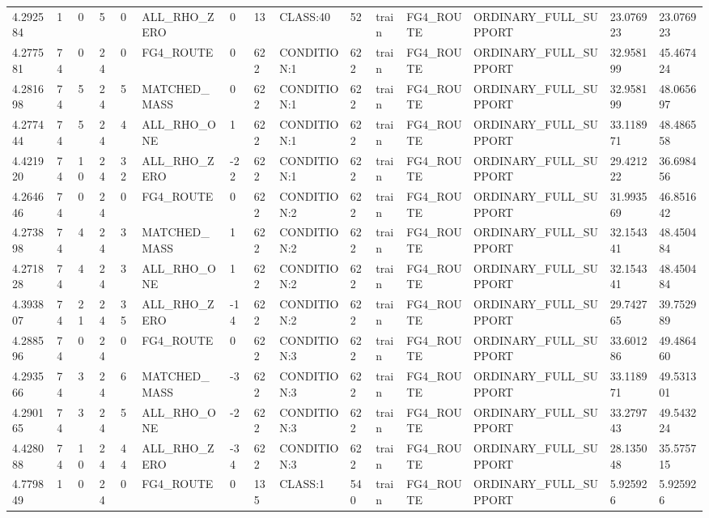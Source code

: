 \begin{tabular}{lllllllllllllll}
4.292584 & 1 & 0 & 5 & 0 & ALL\_RHO\_ZERO & 0 & 13 & CLASS:40 & 52 & train & FG4\_ROUTE & ORDINARY\_FULL\_SUPPORT & 23.076923 & 23.076923 \\
4.277581 & 74 & 0 & 24 & 0 & FG4\_ROUTE & 0 & 622 & CONDITION:1 & 622 & train & FG4\_ROUTE & ORDINARY\_FULL\_SUPPORT & 32.958199 & 45.467424 \\
4.281698 & 74 & 5 & 24 & 5 & MATCHED\_MASS & 0 & 622 & CONDITION:1 & 622 & train & FG4\_ROUTE & ORDINARY\_FULL\_SUPPORT & 32.958199 & 48.065697 \\
4.277444 & 74 & 5 & 24 & 4 & ALL\_RHO\_ONE & 1 & 622 & CONDITION:1 & 622 & train & FG4\_ROUTE & ORDINARY\_FULL\_SUPPORT & 33.118971 & 48.486558 \\
4.421920 & 74 & 10 & 24 & 32 & ALL\_RHO\_ZERO & -22 & 622 & CONDITION:1 & 622 & train & FG4\_ROUTE & ORDINARY\_FULL\_SUPPORT & 29.421222 & 36.698456 \\
4.264646 & 74 & 0 & 24 & 0 & FG4\_ROUTE & 0 & 622 & CONDITION:2 & 622 & train & FG4\_ROUTE & ORDINARY\_FULL\_SUPPORT & 31.993569 & 46.851642 \\
4.273898 & 74 & 4 & 24 & 3 & MATCHED\_MASS & 1 & 622 & CONDITION:2 & 622 & train & FG4\_ROUTE & ORDINARY\_FULL\_SUPPORT & 32.154341 & 48.450484 \\
4.271828 & 74 & 4 & 24 & 3 & ALL\_RHO\_ONE & 1 & 622 & CONDITION:2 & 622 & train & FG4\_ROUTE & ORDINARY\_FULL\_SUPPORT & 32.154341 & 48.450484 \\
4.393807 & 74 & 21 & 24 & 35 & ALL\_RHO\_ZERO & -14 & 622 & CONDITION:2 & 622 & train & FG4\_ROUTE & ORDINARY\_FULL\_SUPPORT & 29.742765 & 39.752989 \\
4.288596 & 74 & 0 & 24 & 0 & FG4\_ROUTE & 0 & 622 & CONDITION:3 & 622 & train & FG4\_ROUTE & ORDINARY\_FULL\_SUPPORT & 33.601286 & 49.486460 \\
4.293566 & 74 & 3 & 24 & 6 & MATCHED\_MASS & -3 & 622 & CONDITION:3 & 622 & train & FG4\_ROUTE & ORDINARY\_FULL\_SUPPORT & 33.118971 & 49.531301 \\
4.290165 & 74 & 3 & 24 & 5 & ALL\_RHO\_ONE & -2 & 622 & CONDITION:3 & 622 & train & FG4\_ROUTE & ORDINARY\_FULL\_SUPPORT & 33.279743 & 49.543224 \\
4.428088 & 74 & 10 & 24 & 44 & ALL\_RHO\_ZERO & -34 & 622 & CONDITION:3 & 622 & train & FG4\_ROUTE & ORDINARY\_FULL\_SUPPORT & 28.135048 & 35.575715 \\
4.779849 & 1 & 0 & 24 & 0 & FG4\_ROUTE & 0 & 135 & CLASS:1 & 540 & train & FG4\_ROUTE & ORDINARY\_FULL\_SUPPORT & 5.925926 & 5.925926 \\

\end{tabular}
